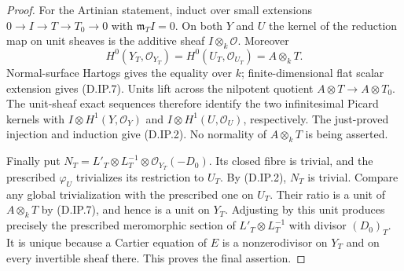 \begin{proof}
For the Artinian statement, induct over small extensions
$0\to I\to T\to T_0\to0$ with $\mathfrak m_T I=0$.
On both $Y$ and $U$ the kernel of the reduction map on
unit sheaves is the additive sheaf $I\otimes_k\mathcal O$.
Moreover
\[
 H^0(Y_T,\mathcal O_{Y_T})
   =H^0(U_T,\mathcal O_{U_T})=A\otimes_k T.            \tag{D.IP.7}
\]
Normal-surface Hartogs gives the equality over $k$;
finite-dimensional flat scalar extension gives (D.IP.7).
Units lift across the nilpotent quotient
$A\otimes T\to A\otimes T_0$. The unit-sheaf exact
sequences therefore identify the two infinitesimal
Picard kernels with
$I\otimes H^1(Y,\mathcal O_Y)$ and
$I\otimes H^1(U,\mathcal O_U)$, respectively.
The just-proved injection and induction give (D.IP.2).
No normality of $A\otimes_kT$ is being asserted.

Finally put
$N_T=L'_T\otimes L_T^{-1}\otimes\mathcal O_{Y_T}(-D_0)$.
Its closed fibre is trivial, and the prescribed
$\varphi_U$ trivializes its restriction to $U_T$.
By (D.IP.2), $N_T$ is trivial. Compare any global
trivialization with the prescribed one on $U_T$.
Their ratio is a unit of $A\otimes_k T$ by (D.IP.7),
and hence is a unit on $Y_T$. Adjusting by this unit
produces precisely the prescribed meromorphic section
of $L'_T\otimes L_T^{-1}$ with divisor $(D_0)_T$.
It is unique because a Cartier equation of $E$ is a
nonzerodivisor on $Y_T$ and on every invertible sheaf
there. This proves the final assertion.
\end{proof}

